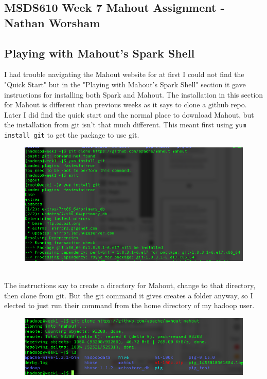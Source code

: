 \documentclass[10pt]{article}
\begin{document}
\subsection*{MSDS610 Week 7 Mahout Assignment - Nathan Worsham}
\subsection*{Playing with Mahout's Spark Shell}
I had trouble navigating the Mahout website for at first I could not find the "Quick Start" but in the "Playing with Mahout's Spark Shell" section it gave instructions for installing both Spark and Mahout. The installation in this section for Mahout is different than previous weeks as it says to clone a github repo. Later I did find the quick start and the normal place to download Mahout, but the installation from git isn't that much different. This meant first using \verb|yum install git| to get the package to use git. 
\begin{figure}[!h]
\includegraphics[scale=0.37]{git.png}
\centering
\end{figure}\\
\indent The instructions say to create a directory for Mahout, change to that directory, then clone from git.  But the git command it gives creates a folder anyway, so I elected to just run their command from the home directory of my hadoop user.  
\begin{figure}[!h]
\includegraphics[scale=0.37]{git_mahout.png}
\centering
\end{figure}\\
\end{document}
